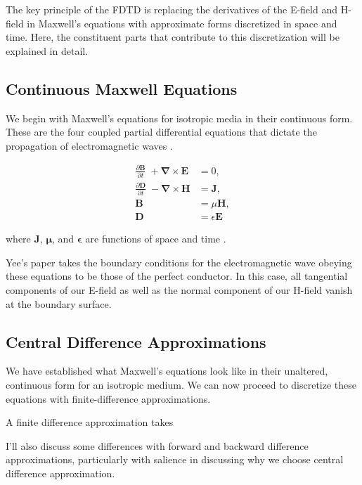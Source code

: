 \documentclass[reprint,preprintnumbers,amsmath,amssymb,aps,nofootinbib,showkeys]{revtex4-2}
\begin{document}
    The key principle of the FDTD is replacing the derivatives of the E-field and H-field in Maxwell's equations with approximate forms discretized in space and time. Here, the constituent parts that contribute to this discretization will be explained in detail.

\subsection{Continuous Maxwell Equations}\label{maxwell}

    We begin with Maxwell's equations for isotropic media in their continuous form. These are the four coupled partial differential equations that dictate the propagation of electromagnetic waves \cite{Ohner}.

    \begin{align}
        \frac{\partial\bm{B}}{\partial t}\; + \bm{\nabla}\times\bm{E} &= 0,\label{eq:faraday}
        \\
        \frac{\partial\bm{D}}{\partial t}\; - \bm{\nabla}\times\bm{H} &= \bm{J},\label{eq:ampere}
        \\
        \bm{B} &= \mu\bm{H},
        \\
        \bm{D} &= \epsilon\bm{E}\;
    \end{align}

    where $\bm{J}$, $\bm{\mu}$, and $\bm{\epsilon}$ are functions of space and time \cite{Yee}.
    
    Yee's paper takes the boundary conditions for the electromagnetic wave obeying these equations to be those of the perfect conductor. In this case, all tangential components of our E-field as well as the normal component of our H-field vanish at the boundary surface.

\subsection{Central Difference Approximations}\label{cda}
    
    We have established what Maxwell's equations look like in their unaltered, continuous form for an isotropic medium. We can now proceed to discretize these equations with finite-difference approximations.

    A finite difference approximation takes 

    I'll also discuss some differences with forward and backward difference approximations, particularly with salience in discussing why we choose central difference approximation.
\end{document}
